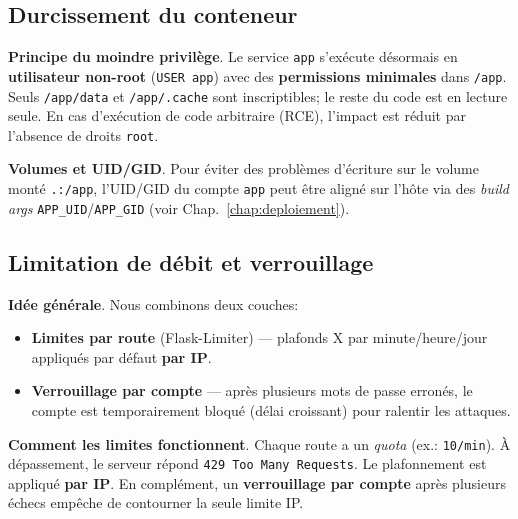 \subsection*{Durcissement du conteneur}
\noindent \textbf{Principe du moindre privilège}. Le service \texttt{app} s'exécute désormais en \textbf{utilisateur non-root} (\texttt{USER app}) avec des \textbf{permissions minimales} dans \texttt{/app}. Seuls \texttt{/app/data} et \texttt{/app/.cache} sont inscriptibles; le reste du code est en lecture seule. En cas d'exécution de code arbitraire (RCE), l'impact est réduit par l'absence de droits \texttt{root}.

\noindent \textbf{Volumes et UID/GID}. Pour éviter des problèmes d'écriture sur le volume monté \texttt{.:/app}, l'UID/GID du compte \texttt{app} peut être aligné sur l'hôte via des \textit{build args} \texttt{APP\_UID}/\texttt{APP\_GID} (voir Chap.~\ref{chap:deploiement}).

\subsection*{Limitation de débit et verrouillage}
\noindent \textbf{Idée générale}. Nous combinons deux couches:
\begin{itemize}
  \item \textbf{Limites par route} (Flask-Limiter) — plafonds \og X par minute/heure/jour \fg{} appliqués par défaut \textbf{par IP}.
  \item \textbf{Verrouillage par compte} — après plusieurs mots de passe erronés, le compte est temporairement bloqué (délai croissant) pour ralentir les attaques.
\end{itemize}

\noindent \textbf{Comment les limites fonctionnent}. Chaque route a un \emph{quota} (ex.: \texttt{10/min}). À dépassement, le serveur répond \texttt{429 Too Many Requests}. Le plafonnement est appliqué \textbf{par IP}. En complément, un \textbf{verrouillage par compte} après plusieurs échecs empêche de contourner la seule limite IP.

